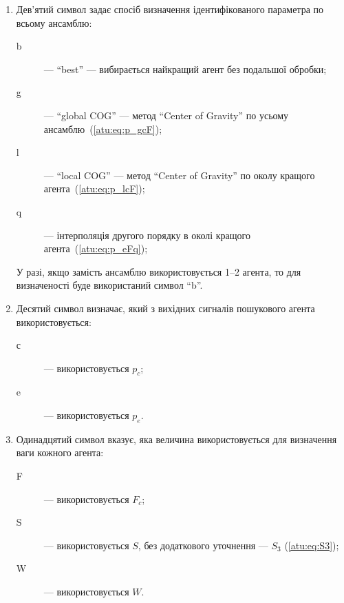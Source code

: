 \begin{enumerate}
  \item
     Дев'ятий символ задає спосіб визначення ідентифікованого параметра по всьому ансамблю:
    \begin{description}

      \item[b]  --- ``best'' ---
        вибирається найкращий агент без подальшої обробки;

      \item[g]  --- ``global COG'' ---
        метод ``Center of Gravity'' по усьому ансамблю~(\ref{atu:eq:p_gcF});

      \item[l] --- ``local COG'' ---
        метод ``Center of Gravity'' по околу кращого агента~(\ref{atu:eq:p_lcF});

      \item[q] ---
        інтерполяція другого порядку в околі кращого агента~(\ref{atu:eq:p_eFq});

    \end{description}

  У разі, якщо замість ансамблю використовується 1--2 агента, то
  для визначеності буде використаний символ ``b''.


  \item
     Десятий символ визначає, який з вихідних сигналів пошукового агента використовується:
    \begin{description}

      \item[с]  ---  використовується $p_c$;

      \item[e]  --- використовується $p_e$.

    \end{description}

  \item
    Одинадцятий символ вказує,
    яка величина використовується для визначення ваги кожного агента:
    \begin{description}

      \item[F]  ---
        використовується $F_c$;

      \item[S]  ---
        використовується $S$, без додаткового уточнення --- $S_{3}$ (\ref{atu:eq:S3});

      \item[W]  ---
        використовується $W$.

    \end{description}


\end{enumerate}

